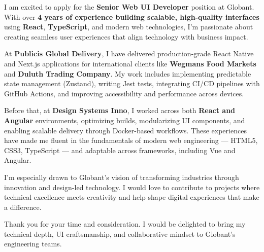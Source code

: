 \documentclass[11pt,a4paper]{awesome-cv}
\begin{document}
\makecvheader[R]
\makelettertitle

\begin{cvletter}

I am excited to apply for the \textbf{Senior Web UI Developer} position at Globant. With over \textbf{4 years of experience building scalable, high-quality interfaces} using \textbf{React}, \textbf{TypeScript}, and modern web technologies, I’m passionate about creating seamless user experiences that align technology with business impact.

At \textbf{Publicis Global Delivery}, I have delivered production-grade React Native and Next.js applications for international clients like \textbf{Wegmans Food Markets} and \textbf{Duluth Trading Company}. My work includes implementing predictable state management (Zustand), writing Jest tests, integrating CI/CD pipelines with GitHub Actions, and improving accessibility and performance across devices.  

Before that, at \textbf{Design Systems Inno}, I worked across both \textbf{React and Angular} environments, optimizing builds, modularizing UI components, and enabling scalable delivery through Docker-based workflows. These experiences have made me fluent in the fundamentals of modern web engineering — HTML5, CSS3, TypeScript — and adaptable across frameworks, including Vue and Angular.

I’m especially drawn to Globant’s vision of transforming industries through innovation and design-led technology. I would love to contribute to projects where technical excellence meets creativity and help shape digital experiences that make a difference.

Thank you for your time and consideration. I would be delighted to bring my technical depth, UI craftsmanship, and collaborative mindset to Globant’s engineering teams.

\end{cvletter}

\makeletterclosing
\end{document}
